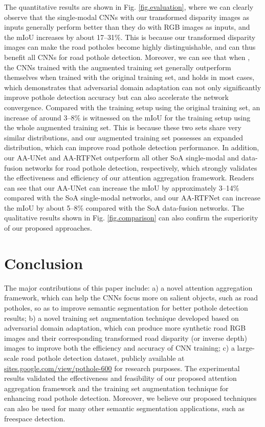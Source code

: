 \documentclass[runningheads]{llncs}
\begin{document}
The quantitative results are shown in Fig. \ref{fig.evaluation}, where we can clearly observe that the single-modal CNNs with our transformed disparity images as inputs generally perform better than they do with RGB images as inputs, and the mIoU increases by about 17--31\%. This is because our transformed disparity images can make the road potholes become highly distinguishable, and can thus benefit all CNNs for road pothole detection. Moreover, we can see that when , the CNNs trained with the augmented training set generally outperform themselves when trained with the original training set, and  holds in most cases, which demonstrates that adversarial domain adaptation can not only significantly improve pothole detection accuracy but  can also accelerate the network convergence. Compared with the training setup using the original training set, an increase of around 3--8\% is witnessed on the mIoU for the training setup using the whole augmented training set. This is because these two sets share very similar distributions, and our augmented training set possesses an expanded distribution, which can improve road pothole detection performance. In addition, our AA-UNet and AA-RTFNet outperform all other SoA single-modal and data-fusion networks for road pothole detection, respectively, which strongly validates the effectiveness and efficiency of our attention aggregation framework. Readers can see that our AA-UNet can increase the mIoU by approximately 3--14\% compared with the SoA single-modal networks, and our AA-RTFNet can increase the mIoU by about 5--8\% compared with the SoA data-fusion networks. The qualitative results shown in Fig. \ref{fig.comparison} can also confirm the superiority of our proposed approaches.


\section{Conclusion}
\label{sec.conclusion}
The major contributions of this paper include: a) a novel attention aggregation framework, which can help the CNNs focus more on salient objects, such as road potholes, so as to improve semantic segmentation for better  pothole detection results; b) a novel training set augmentation technique developed based on adversarial domain adaptation, which can produce more synthetic road RGB images and their corresponding transformed road disparity (or inverse depth) images to improve both the efficiency and accuracy of CNN training; c) a large-scale road pothole detection dataset, publicly available at \url{sites.google.com/view/pothole-600} for research purposes. The experimental results validated the effectiveness and feasibility of our proposed attention aggregation framework and the training set augmentation technique for enhancing road pothole detection. Moreover, we believe our proposed techniques can also be used for many other semantic segmentation applications, such as freespace detection.
\end{document}
